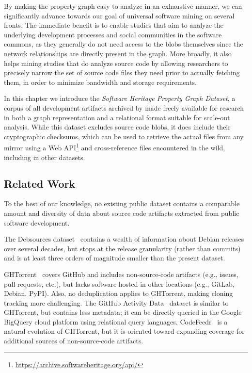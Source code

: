 By making the property graph easy to analyze in an exhaustive manner, we can
significantly advance towards our goal of universal software mining on several
fronts. The immediate benefit is to enable studies that aim to analyze the
underlying development processes and social communities in the software
commons, as they generally do not need access to the blobs themselves since the
network relationships are directly present in the graph. More broadly, it also
helps mining studies that do analyze source code by allowing researchers to
precisely narrow the set of source code files they need prior to actually
fetching them, in order to minimize bandwidth and storage requirements.

In this chapter we introduce the \emph{Software Heritage Property Graph
Dataset}, a corpus of all development artifacts archived by \SWH{} made freely
available for research in both a graph representation and a relational format
suitable for scale-out analysis.
While this dataset excludes source code blobs, it does include their
cryptographic checksums, which can be used to retrieve the actual files from
any \SWH{} mirror using a Web
API\footnote{\url{https://archive.softwareheritage.org/api/}} and
cross-reference files encountered in the wild, including in other datasets.

\subsection{Related Work}%
\label{sec:graph-dataset-related}

To the best of our knowledge, no existing public dataset contains a comparable
amount and diversity of data about source code artifacts extracted from public
software development.

The Debsources dataset~\cite{debsources-ese-2016} contains a wealth of
information about Debian releases over several decades, but stops at the
release granularity (rather than commits) and is at least three orders of
magnitude smaller than the present dataset.

GHTorrent~\cite{GHTorrent} covers GitHub and includes
non-source-code artifacts (e.g., issues, pull requests, etc.), but lacks
software hosted in other locations (e.g., GitLab, Debian, PyPI).
Also, no deduplication applies to GHTorrent, making cloning tracking more
challenging.
The GitHub Activity Data~\cite{web:github-activity-data} dataset is similar to
GHTorrent, but contains less metadata; it can be directly queried in the
Google BigQuery cloud platform using relational query languages.
CodeFeedr~\cite{DBLP:conf/icse/VargasHKBG18} is a natural evolution of
GHTorrent, but it is oriented toward expanding coverage for additional sources
of non-source-code artifacts.

